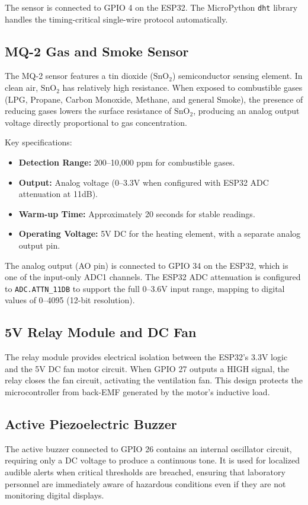 \documentclass[12pt,a4paper]{report}
\begin{document}
The sensor is connected to GPIO 4 on the ESP32. The MicroPython \texttt{dht} library handles the timing-critical single-wire protocol automatically.

\subsection{MQ-2 Gas and Smoke Sensor}
The MQ-2 sensor features a tin dioxide ($\text{SnO}_2$) semiconductor sensing element. In clean air, $\text{SnO}_2$ has relatively high resistance. When exposed to combustible gases (LPG, Propane, Carbon Monoxide, Methane, and general Smoke), the presence of reducing gases lowers the surface resistance of $\text{SnO}_2$, producing an analog output voltage directly proportional to gas concentration.

Key specifications:
\begin{itemize}
    \item \textbf{Detection Range:} 200--10,000 ppm for combustible gases.
    \item \textbf{Output:} Analog voltage (0--3.3V when configured with ESP32 ADC attenuation at 11dB).
    \item \textbf{Warm-up Time:} Approximately 20 seconds for stable readings.
    \item \textbf{Operating Voltage:} 5V DC for the heating element, with a separate analog output pin.
\end{itemize}

The analog output (AO pin) is connected to GPIO 34 on the ESP32, which is one of the input-only ADC1 channels. The ESP32 ADC attenuation is configured to \texttt{ADC.ATTN\_11DB} to support the full 0--3.6V input range, mapping to digital values of 0--4095 (12-bit resolution).

\subsection{5V Relay Module and DC Fan}
The relay module provides electrical isolation between the ESP32's 3.3V logic and the 5V DC fan motor circuit. When GPIO 27 outputs a HIGH signal, the relay closes the fan circuit, activating the ventilation fan. This design protects the microcontroller from back-EMF generated by the motor's inductive load.

\subsection{Active Piezoelectric Buzzer}
The active buzzer connected to GPIO 26 contains an internal oscillator circuit, requiring only a DC voltage to produce a continuous tone. It is used for localized audible alerts when critical thresholds are breached, ensuring that laboratory personnel are immediately aware of hazardous conditions even if they are not monitoring digital displays.
\end{document}

